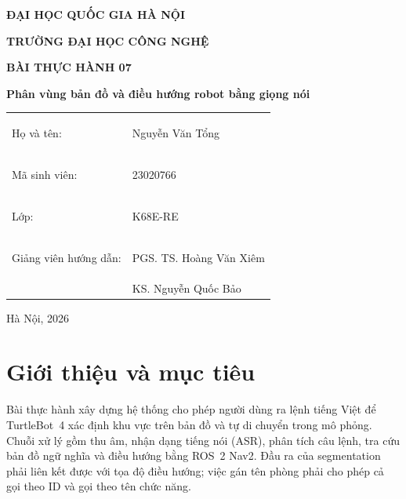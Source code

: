 \documentclass[12pt,a4paper]{article}
\renewcommand{\arraystretch}{1.2}
\begin{document}
\begin{titlepage}
  \centering
  \vspace*{0.8cm}
  {\Large\bfseries ĐẠI HỌC QUỐC GIA HÀ NỘI\par}
  \vspace{0.25cm}
  {\Large\bfseries TRƯỜNG ĐẠI HỌC CÔNG NGHỆ\par}
  \vspace{1.1cm}
  \vspace{1.1cm}
  {\Huge\bfseries BÀI THỰC HÀNH 07\par}
  \vspace{0.4cm}
  {\LARGE\bfseries Phân vùng bản đồ và điều hướng robot bằng giọng nói\par}
  \vspace{1.3cm}
  \begin{flushleft}
    \renewcommand{\arraystretch}{1.5}
    \begin{tabular}{@{}>{\bfseries\raggedright\arraybackslash}p{5cm}p{9cm}@{}}
      Họ và tên: & Nguyễn Văn Tổng \\
      Mã sinh viên: & 23020766 \\
      Lớp: & K68E-RE \\
      Giảng viên hướng dẫn: & PGS. TS. Hoàng Văn Xiêm \\
                            & KS. Nguyễn Quốc Bảo \\
    \end{tabular}
  \end{flushleft}
  \vfill
  {\large Hà Nội, 2026\par}
\end{titlepage}
\tableofcontents
\newpage
\listoffigures
\listoftables
\newpage
{}

\section{Giới thiệu và mục tiêu}
Bài thực hành xây dựng hệ thống cho phép người dùng ra lệnh tiếng Việt để
TurtleBot~4 xác định khu vực trên bản đồ và tự di chuyển trong mô phỏng.
Chuỗi xử lý gồm thu âm, nhận dạng tiếng nói (ASR), phân tích câu lệnh,
tra cứu bản đồ ngữ nghĩa và điều hướng bằng ROS~2 Nav2.
Đầu ra của segmentation phải liên kết được với tọa độ điều hướng; việc
gán tên phòng phải cho phép cả gọi theo ID và gọi theo tên chức năng.
\end{document}
